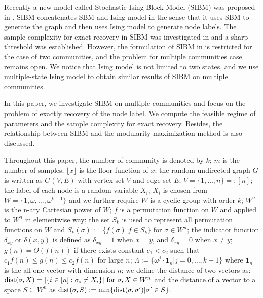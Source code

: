 \documentclass{article}
\begin{document}
Recently a new model called Stochastic Ising Block Model (SIBM) was proposed in \cite{ye2020exact}. SIBM concatenates SBM and Ising model in the sense that it uses SBM to generate the graph and then uses Ising model to generate node labels. The sample complexity for exact recovery in SIBM was investigated in \cite{ye2020exact} and a sharp threshold was established. However, the formulation of SIBM in \cite{ye2020exact} is restricted for the case of two communities, and the problem for multiple communities case remains open.
We notice that Ising model is not limited to two states, 
and we use multiple-state Ising model \cite{potts1952some} to obtain similar results of SIBM on multiple communities.

In this paper, we  investigate SIBM on multiple communities and focus on the problem of exactly recovery of the node label.
We  compute the feasible regime of parameters and the sample complexity for exact recovery. Besides, the relationship between SIBM and the modularity maximization method
is also discussed. 

Throughout this paper, the number of community is denoted by $k$; $m$ is the number of samples; $\lfloor x \rfloor$ is the floor function of $x$; the random undirected graph $G$ is written as $G(V,E)$ with vertex set $V$ and edge set $E$;
$V=\{1,\dots, n\} =: [n]$;
the label of each node is a random variable $X_i$; $X_i$ is chosen from $W= \{1, \omega, \dots, \omega^{k-1}\}$ and we further require $W$
is a cyclic group with order $k$; $W^n$ is the n-ary Cartesian power of $W$; $f$ is a permutation function on $W$ and applied to $W^n$ in elementwise way; the set $S_k$ is used to represent all permutation functions on $W$ and $S_k(\sigma):=\{f(\sigma)| f\in S_k\}$ for $\sigma \in W^n$; the indicator function $\delta_{xy}$ or $\delta(x,y)$ is defined as
$\delta_{xy} = 1 $ when $x=y$, and $\delta_{xy}=0$ when $x\neq y$; $g(n) = \Theta(f(n))$ if there exists constant $c_1 < c_2$ such that $c_1 f(n) \leq g(n) \leq c_2 f(n)$
for large $n$;
$\Lambda := \{ \omega^j  \cdot \mathbf{1}_n | j=0, \dots,k-1\}$
where $\mathbf{1}_n$ is the all one vector with dimension $n$;
we define the distance of two vectors as:
$\operatorname{dist}(\sigma, X)
=|\{i\in[n]:\sigma_i\neq X_i\}| \textrm{ for } \sigma,X\in W^n
$ and the distance of a vector to a space $S\subseteq W^n$
as
$\operatorname{dist}(\sigma,S)
:=\min\{\operatorname{dist}(\sigma, \sigma') | \sigma' \in S\}
$.
\end{document}
